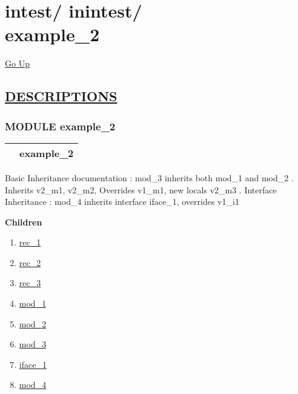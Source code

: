 \chapter*{\color{headfile}
{\large intest\slash\hspace{0pt}}
{\large inintest\slash\hspace{0pt}}
 \\
example_2
}
\hypertarget{ecldoc:toc:intest.inintest.example_2}{}
\hyperlink{ecldoc:toc:root/intest/inintest}{Go Up}


\section*{\underline{\textsf{DESCRIPTIONS}}}
\subsection*{\textsf{\colorbox{headtoc}{\color{white} MODULE}
example\_2}}

\hypertarget{ecldoc:intest.inintest.example_2}{}

{\renewcommand{\arraystretch}{1.5}
\begin{tabularx}{\textwidth}{|>{\raggedright\arraybackslash}l|X|}
\hline
\hspace{0pt}\mytexttt{\color{red} } & \textbf{example\_2} \\
\hline
\end{tabularx}
}

\par
Basic Inheritance documentation : mod\_3 inherits both mod\_1 and mod\_2 . Inherits v2\_m1, v2\_m2, Overrides v1\_m1, new locals v2\_m3 . Interface Inheritance : mod\_4 inherits interface iface\_1, overrides v1\_i1


\textbf{Children}
\begin{enumerate}
\item \hyperlink{ecldoc:intest.inintest.example_2.rec_1}{rec\_1}
\item \hyperlink{ecldoc:intest.inintest.example_2.rec_2}{rec\_2}
\item \hyperlink{ecldoc:intest.inintest.example_2.rec_3}{rec\_3}
\item \hyperlink{ecldoc:intest.inintest.example_2.mod_1}{mod\_1}
\item \hyperlink{ecldoc:intest.inintest.example_2.mod_2}{mod\_2}
\item \hyperlink{ecldoc:intest.inintest.example_2.mod_3}{mod\_3}
\item \hyperlink{ecldoc:intest.inintest.example_2.iface_1}{iface\_1}
\item \hyperlink{ecldoc:intest.inintest.example_2.mod_4}{mod\_4}
\end{enumerate}

